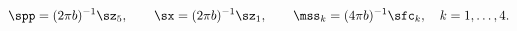 \begin{equation}
\spp=(2\pi b)^{-1}\sz_5,\qquad
\sx=(2\pi b)^{-1}\sz_1,\qquad \mss_k=(4\pi b)^{-1}\sfc_k, \quad
k=1,\dots,4.
\end{equation} 
